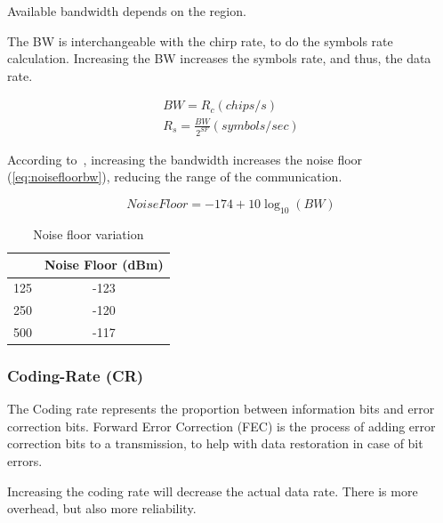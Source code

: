 Available bandwidth depends on the region. %

The BW is interchangeable with the chirp rate, to do the symbols rate
calculation.
Increasing the BW increases the symbols rate, and thus, the data rate.

\begin{gather}
 \label{eq:bw} 
  BW = R_c (chips/s) \\
  R_s = \frac{BW}{2^{SF}} (symbols / sec)
\end{gather}

According to~\cite{semtech:modulationbasics}, increasing the
bandwidth increases the noise floor (\ref{eq:noisefloorbw}), reducing the
range of the communication.

\begin{equation}
 \label{eq:noisefloorbw} 
  Noise Floor = -174 + 10 \log_{10}(BW)
\end{equation}


\begin{table}[h!]
\centering
\begin{tabular}{|c|c|}
\hline
\rowcolor[HTML]{C0C0C0} 
\multicolumn{1}{|c|}{\cellcolor[HTML]{C0C0C0}Bandwidth(kHz)} & Noise Floor (dBm) \\ \hline
125                                                          & -123              \\ \hline
250                                                          & -120              \\ \hline
500                                                          & -117              \\ \hline
\end{tabular}
\caption{Noise floor variation\label{table:bw}}
\end{table}


\subsubsection{Coding-Rate (CR)}

The Coding rate represents the proportion between information bits and error
correction bits. 
Forward Error Correction (FEC) is the process of adding error correction bits to a
transmission, to help with data restoration in case of bit errors.

Increasing the coding rate will decrease the actual data rate. 
There is more overhead, but also more reliability.

